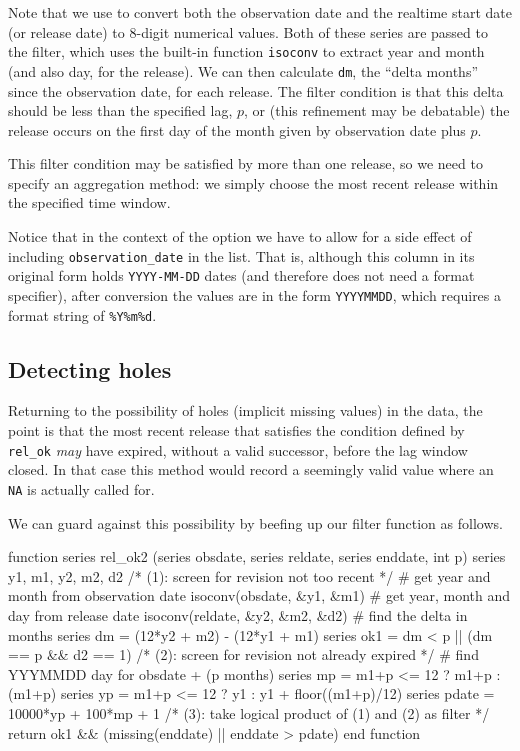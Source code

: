Note that we use  to convert both the observation
date and the realtime start date (or release date) to 8-digit
numerical values. Both of these series are passed to the filter, which
uses the built-in function \texttt{isoconv} to extract year and month
(and also day, for the release). We can then calculate \texttt{dm},
the ``delta months'' since the observation date, for each release.
The filter condition is that this delta should be less than the
specified lag, $p$, or (this refinement may be debatable) the release
occurs on the first day of the month given by observation date plus
$p$.

This filter condition may be satisfied by more than one release, so we
need to specify an aggregation method: we simply choose the most
recent release within the specified time window.

Notice that in the context of the  option we have to
allow for a side effect of including \verb|observation_date| in the
 list. That is, although this column in its original
form holds \texttt{YYYY-MM-DD} dates (and therefore does not need a
format specifier), after conversion the values are in the form
\texttt{YYYYMMDD}, which requires a format string of \verb|%Y%m%d|.

\subsection{Detecting holes}

Returning to the possibility of holes (implicit missing values) in the
data, the point is that the most recent release that satisfies the
condition defined by \verb|rel_ok| \textit{may} have expired,
without a valid successor, before the lag window closed. In that case
this method would record a seemingly valid value where an \texttt{NA}
is actually called for.

We can guard against this possibility by beefing up our filter function
as follows.
%
\begin{code}
function series rel_ok2 (series obsdate, series reldate,
                         series enddate, int p)
  series y1, m1, y2, m2, d2
  /* (1): screen for revision not too recent */
  # get year and month from observation date
  isoconv(obsdate, &y1, &m1)
  # get year, month and day from release date
  isoconv(reldate, &y2, &m2, &d2)
  # find the delta in months
  series dm = (12*y2 + m2) - (12*y1 + m1)
  series ok1 = dm < p || (dm == p && d2 == 1)
  /* (2): screen for revision not already expired */
  # find YYYMMDD day for obsdate + (p months)
  series mp = m1+p <= 12 ? m1+p : (m1+p)%
  series yp = m1+p <= 12 ? y1 : y1 + floor((m1+p)/12)
  series pdate = 10000*yp + 100*mp + 1
  /* (3): take logical product of (1) and (2) as filter */
  return ok1 && (missing(enddate) || enddate > pdate)
end function
\end{code}

